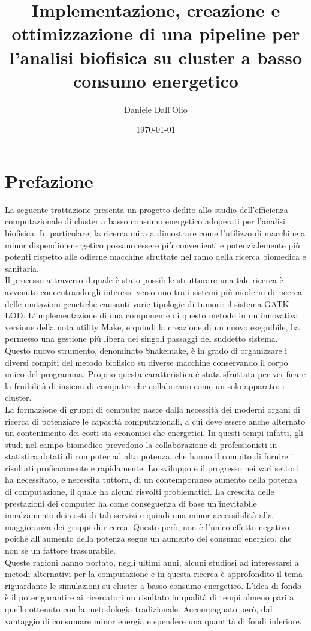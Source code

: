 \documentclass[12pt, a4paper]{report}
\title{Implementazione, creazione e ottimizzazione di una pipeline per l'analisi biofisica su cluster a basso consumo energetico}
\author{Daniele Dall'Olio}
\date{\today}
\begin{document}
\section*{Prefazione}
La seguente trattazione presenta un progetto dedito allo studio dell'efficienza computazionale di cluster a basso consumo energetico adoperati per l'analisi biofisica. In particolare, la ricerca mira a dimostrare come l'utilizzo di macchine a minor dispendio energetico possano essere più convenienti e potenzialemente più potenti rispetto alle odierne macchine sfruttate nel ramo della ricerca biomedica e sanitaria. 
\\
Il processo attraverso il quale è stato possibile strutturare una tale ricerca è avvenuto concentrando gli interessi verso uno tra i sistemi più moderni di ricerca delle mutazioni genetiche causanti varie tipologie di tumori: il sistema GATK-LOD.
L'implementazione di una componente di questo metodo in un innovativa versione della nota utility Make, e quindi la creazione di un nuovo eseguibile, ha permesso una gestione più libera dei singoli passaggi del suddetto sistema. \\
Questo nuovo strumento, denominato Snakemake, è in grado di organizzare i diversi compiti del metodo biofisico su diverse macchine conservando il corpo unico del programma. Proprio questa caratteristica è stata sfruttata per verificare la fruibilità di insiemi di computer che collaborano come un solo apparato: i cluster. \\
La formazione di gruppi di computer nasce dalla necessità dei moderni organi di ricerca di potenziare le capacità computazionali, a cui deve essere anche alternato un contenimento dei costi sia economici che energetici.
In questi tempi infatti, gli studi nel campo biomedico prevedono la collaborazione di professionisti in statistica dotati di computer ad alta potenza, che hanno il compito di fornire i risultati proficuamente e rapidamente. Lo sviluppo e il progresso nei vari settori ha necessitato, e necessita tuttora, di un contemporaneo aumento della potenza di computazione, il quale ha alcuni risvolti problematici. La crescita delle prestazioni dei computer ha come conseguenza di base un'inevitabile innalzamento dei costi di tali servizi e quindi una minor accessibilità alla maggioranza dei gruppi di ricerca. Questo però, non è l'unico effetto negativo poichè all'aumento della potenza segue un aumento del consumo energico, che non sè un fattore trascurabile. \\
Queste ragioni hanno portato, negli ultimi anni, alcuni studiosi ad interessarsi a metodi alternativi per la computazione e in questa ricerca è approfondito il tema riguardante le simulazioni su cluster a basso consumo energetico. L'idea di fondo è il poter garantire ai ricercatori un risultato in qualità di tempi almeno pari a quello ottenuto con la metodologia tradizionale. Accompagnato però, dal vantaggio di consumare minor energia e spendere una quantità di fondi inferiore.
\end{document}
